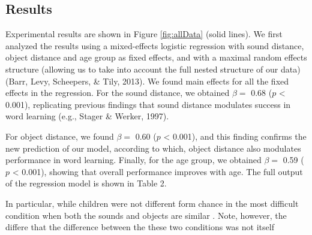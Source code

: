\documentclass[english,,man]{apa6}
\begin{document}
\hypertarget{results}{%
\subsection{Results}\label{results}}

Experimental results are shown in Figure \ref{fig:allData} (solid lines). We first analyzed the results using a mixed-effects logistic regression with sound distance, object distance and age group as fixed effects, and with a maximal random effects structure (allowing us to take into account the full nested structure of our data) (Barr, Levy, Scheepers, \& Tily, 2013). We found main effects for all the fixed effects in the regression. For the sound distance, we obtained \(\beta =\) 0.68 (\(p\) \textless{} 0.001), replicating previous findings that sound distance modulates success in word learning (e.g., Stager \& Werker, 1997).

For object distance, we found \(\beta =\) 0.60 (\(p\) \textless{} 0.001), and this finding confirms the new prediction of our model, according to which, object distance also modulates performance in word learning. Finally, for the age group, we obtained \(\beta =\) 0.59 (\(p\) \textless{} 0.001), showing that overall performance improves with age. The full output of the regression model is shown in Table 2.

In particular, while children were not different form chance in the most difficult condition when both the sounds and objects are similar . Note, however, the differe that the difference between the these two conditions was not itself

\begin{table}

\caption{\label{tab:models}Characteristics and performance of the models used in this study. Value ranges represent 95\% confidence intervals.}
\centering
{}
\end{table}
\end{document}
